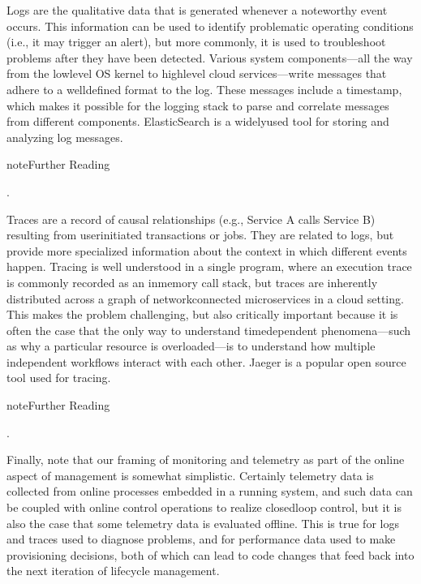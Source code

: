 \documentclass[a4paper,11pt,english]{sphinxmanual}
\begin{document}
\sphinxAtStartPar
Logs are the qualitative data that is generated whenever a noteworthy
event occurs. This information can be used to identify problematic
operating conditions (i.e., it may trigger an alert), but more
commonly, it is used to troubleshoot problems after they have been
detected. Various system components—all the way from the low\sphinxhyphen{}level OS
kernel to high\sphinxhyphen{}level cloud services—write messages that adhere to a
well\sphinxhyphen{}defined format to the log. These messages include a timestamp,
which makes it possible for the logging stack to parse and correlate
messages from different components. ElasticSearch is a widely\sphinxhyphen{}used
tool for storing and analyzing log messages.

\label{\detokenize{cloud:reading-logging}}
\begin{sphinxadmonition}{note}{Further Reading}

\sphinxAtStartPar
{}.
\end{sphinxadmonition}

\sphinxAtStartPar
Traces are a record of causal relationships (e.g., Service A calls
Service B) resulting from user\sphinxhyphen{}initiated transactions or jobs. They
are related to logs, but provide more specialized information about
the context in which different events happen. Tracing is
well understood in a single program, where an execution trace is
commonly recorded as an in\sphinxhyphen{}memory call stack, but traces are
inherently distributed across a graph of network\sphinxhyphen{}connected
microservices in a cloud setting. This makes the problem challenging,
but also critically important because it is often the case that the
only way to understand time\sphinxhyphen{}dependent phenomena—such as why a
particular resource is overloaded—is to understand how multiple
independent workflows interact with each other. Jaeger is a popular
open source tool used for tracing.

\label{\detokenize{cloud:reading-tracing}}
\begin{sphinxadmonition}{note}{Further Reading}

\sphinxAtStartPar
{}.
\end{sphinxadmonition}

\sphinxAtStartPar
Finally, note that our framing of monitoring and telemetry as part of
the online aspect of management is somewhat simplistic. Certainly
telemetry data is collected from online processes embedded in a
running system, and such data can be coupled with online control
operations to realize closed\sphinxhyphen{}loop control, but it is also the case
that some telemetry data is evaluated offline. This is true for logs
and traces used to diagnose problems, and for performance data used to
make provisioning decisions, both of which can lead to code changes
that feed back into the next iteration of lifecycle management.
\end{document}

